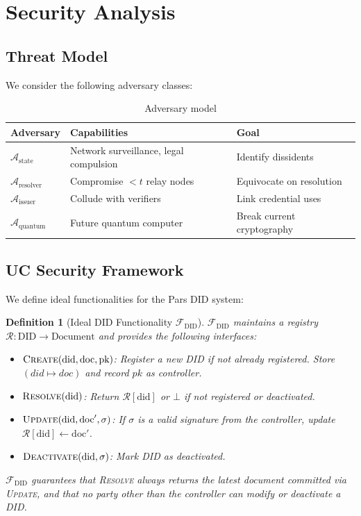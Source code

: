 \documentclass[11pt,a4paper]{article}
\newtheorem{definition}[theorem]{Definition}
\begin{document}
\section{Security Analysis}
\label{sec:security}

\subsection{Threat Model}

We consider the following adversary classes:

\begin{table}[h]
\centering
\caption{Adversary model}
\label{tab:threat-model}
\begin{tabular}{lll}
\toprule
\textbf{Adversary} & \textbf{Capabilities} & \textbf{Goal} \\
\midrule
$\mathcal{A}_{\text{state}}$ & Network surveillance, legal compulsion & Identify dissidents \\
$\mathcal{A}_{\text{resolver}}$ & Compromise $< t$ relay nodes & Equivocate on resolution \\
$\mathcal{A}_{\text{issuer}}$ & Collude with verifiers & Link credential uses \\
$\mathcal{A}_{\text{quantum}}$ & Future quantum computer & Break current cryptography \\
\bottomrule
\end{tabular}
\end{table}

\subsection{UC Security Framework}

We define ideal functionalities for the Pars DID system:

\begin{definition}[Ideal DID Functionality $\mathcal{F}_{\text{DID}}$]
$\mathcal{F}_{\text{DID}}$ maintains a registry $\mathcal{R}: \text{DID} \to \text{Document}$
and provides the following interfaces:
\begin{itemize}
    \item $\textsc{Create}(\text{did}, \text{doc}, \text{pk})$: Register a new DID if
          not already registered. Store $(did \mapsto doc)$ and record $pk$ as controller.
    \item $\textsc{Resolve}(\text{did})$: Return $\mathcal{R}[\text{did}]$ or $\bot$ if
          not registered or deactivated.
    \item $\textsc{Update}(\text{did}, \text{doc}', \sigma)$: If $\sigma$ is a valid
          signature from the controller, update $\mathcal{R}[\text{did}] \gets \text{doc}'$.
    \item $\textsc{Deactivate}(\text{did}, \sigma)$: Mark DID as deactivated.
\end{itemize}
$\mathcal{F}_{\text{DID}}$ guarantees that \textsc{Resolve} always returns the latest
document committed via \textsc{Update}, and that no party other than the controller
can modify or deactivate a DID.
\end{definition}
\end{document}

